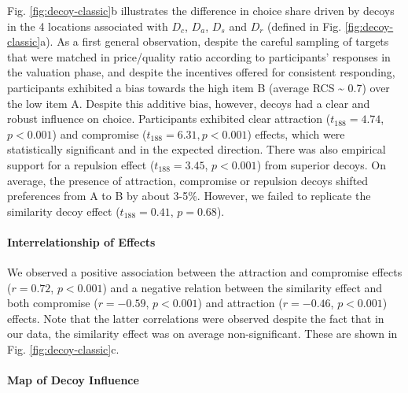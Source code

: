 \documentclass[a4paper, nobind]{templates/ociamthesis}
\begin{document}
Fig. \ref{fig:decoy-classic}b illustrates the difference in choice share driven by decoys in the 4 locations associated with \(D_c\), \(D_a\), \(D_s\) and \(D_r\) (defined in Fig. \ref{fig:decoy-classic}a). As a first general observation, despite the careful sampling of targets that were matched in price/quality ratio according to participants' responses in the valuation phase, and despite the incentives offered for consistent responding, participants exhibited a bias towards the high item B (average RCS \textasciitilde{} 0.7) over the low item A. Despite this additive bias, however, decoys had a clear and robust influence on choice. Participants exhibited clear attraction (\(t_{188}=4.74\), \(p<0.001\)) and compromise (\(t_{188}=6.31, p<0.001\)) effects, which were statistically significant and in the expected direction. There was also empirical support for a repulsion effect (\(t_{188}=3.45\), \(p<0.001\)) from superior decoys. On average, the presence of attraction, compromise or repulsion decoys shifted preferences from A to B by about 3-5\%. However, we failed to replicate the similarity decoy effect (\(t_{188}=0.41\), \(p = 0.68\)).

\hypertarget{interrelationship-of-effects-1}{%
\paragraph{Interrelationship of Effects}\label{interrelationship-of-effects-1}}

We observed a positive association between the attraction and compromise effects (\(r=0.72\), \(p<0.001\)) and a negative relation between the similarity effect and both compromise (\(r=-0.59\), \(p<0.001\)) and attraction (\(r=-0.46\), \(p<0.001\)) effects. Note that the latter correlations were observed despite the fact that in our data, the similarity effect was on average non-significant. These are shown in Fig. \ref{fig:decoy-classic}c.

\hypertarget{map-of-decoy-influence-1}{%
\paragraph{Map of Decoy Influence}\label{map-of-decoy-influence-1}}
\end{document}
